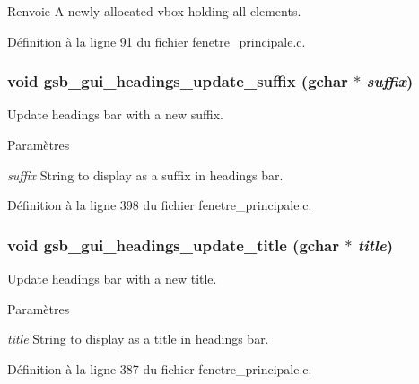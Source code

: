 \begin{DoxyReturn}{Renvoie}
A newly-\/allocated vbox holding all elements. 
\end{DoxyReturn}


Définition à la ligne 91 du fichier fenetre\_\-principale.c.

\subsubsection[{gsb\_\-gui\_\-headings\_\-update\_\-suffix}]{\setlength{\rightskip}{0pt plus 5cm}void gsb\_\-gui\_\-headings\_\-update\_\-suffix (gchar $\ast$ {\em suffix})}\label{fenetre__principale_8h_aeed9c0940d61e6cf37c5f421ce3b663f}
Update headings bar with a new suffix.


\begin{DoxyParams}{Paramètres}
\item[{\em suffix}]String to display as a suffix in headings bar. \end{DoxyParams}


Définition à la ligne 398 du fichier fenetre\_\-principale.c.

\subsubsection[{gsb\_\-gui\_\-headings\_\-update\_\-title}]{\setlength{\rightskip}{0pt plus 5cm}void gsb\_\-gui\_\-headings\_\-update\_\-title (gchar $\ast$ {\em title})}\label{fenetre__principale_8h_a7dd6f116baa9323630e845e36615fc53}
Update headings bar with a new title.


\begin{DoxyParams}{Paramètres}
\item[{\em title}]String to display as a title in headings bar. \end{DoxyParams}


Définition à la ligne 387 du fichier fenetre\_\-principale.c.

